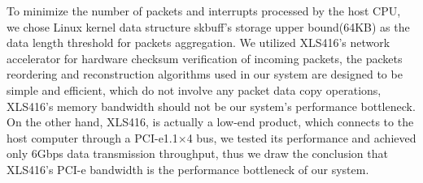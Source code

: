 \documentclass[conference]{IEEEtran}
\begin{document}
To minimize the number of packets and interrupts processed by the host CPU, we chose Linux kernel data structure skbuff's storage upper bound(64KB) as the data length threshold for packets aggregation. We utilized XLS416's network accelerator for hardware checksum verification of incoming packets, the packets reordering and reconstruction algorithms used in our system are designed to be simple and efficient, which do not involve any packet data copy operations, XLS416's memory bandwidth should not be our system's performance bottleneck. On the other hand, XLS416, is actually a low-end product, which connects to the host computer through a PCI-e1.1$\times$4 bus, we tested its performance and achieved only 6Gbps data transmission throughput, thus we draw the conclusion that XLS416's PCI-e bandwidth is the performance bottleneck of our system.
%
%

\end{document}
